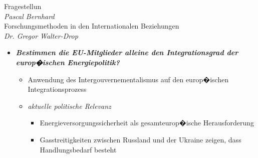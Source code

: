 \documentclass[9pt,a4paper,ngerman]{report}
\begin{document}
 
 	\begin{flushright}
 			{\tiny \textcolor{dunkelgrau.60}{Fragestellun\\
 							\emph{Pascal Bernhard}\\
 							Forschungsmethoden in den Internationalen Beziehungen\\
 							\emph{Dr. Gregor Walter-Drop}}}
 	\end{flushright}						

	

	\begin{center}
			{}
	\end{center} 	

	
 
		
		\begin{itemize}
		
			\item{\textcolor{midblue}{\textbf{\textsl{Bestimmen die EU-Mitglieder 
						alleine den Integrationsgrad der europ�ischen 
						Energiepolitik?}}}}
 
 			\begin{itemize}
 			
 				\item{Anwendung des Intergouvernementalismus 
 							auf den europ�ischen Integrationsprozess}
 				\item{\textsl{aktuelle politische Relevanz}}
 				
 					\begin{itemize}
 					
 					\item{\textcolor{dunkelgrau.60}{Energieversorgungssicherheit 
 								als gesamteurop�ische Herausforderung}}
 					\item{\textcolor{dunkelgrau.60}{Gasstreitigkeiten zwischen 
 								Russland und der 
 								Ukraine zeigen, dass Handlungsbedarf besteht}}
 					\end{itemize}
 					
 			\end{itemize}
 
		\end{itemize} 
 
\end{document}
